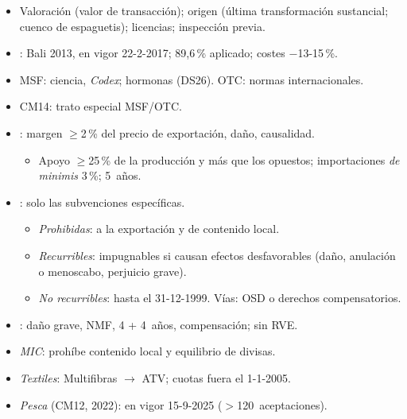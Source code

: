 \documentclass{article}
\begin{document}
\begin{columnas}
\begin{itemize}
\item Valoración (valor de transacción); origen (última transformación sustancial; cuenco de espaguetis); licencias; inspección previa.
\item {}: Bali 2013, en vigor 22-2-2017; 89,6\,\% aplicado; costes $-$13-15\,\%.
\end{itemize}
\begin{itemize}
\item MSF: ciencia, \emph{Codex}; hormonas (DS26). OTC: normas internacionales.
\item CM14: trato especial MSF/OTC.
\end{itemize}
\begin{itemize}
\item {}: margen $\geq$2\,\% del precio de exportación, daño, causalidad.
  \begin{itemize}
  \item Apoyo $\geq$25\,\% de la producción y más que los opuestos; importaciones \emph{de minimis} 3\,\%; 5~años.
  \end{itemize}
\item {}: solo las subvenciones específicas.
  \begin{itemize}
  \item \emph{Prohibidas}: a la exportación y de contenido local.
  \item \emph{Recurribles}: impugnables si causan efectos desfavorables (daño, anulación o menoscabo, perjuicio grave).
  \item \emph{No recurribles}: hasta el 31-12-1999. Vías: OSD o derechos compensatorios.
  \end{itemize}
\item {}: daño grave, NMF, 4 + 4~años, compensación; sin RVE.
\end{itemize}
\begin{itemize}
\item \emph{MIC}: prohíbe contenido local y equilibrio de divisas.
\item \emph{Textiles}: Multifibras $\to$ ATV; cuotas fuera el 1-1-2005.
\item \emph{Pesca} (CM12, 2022): en vigor 15-9-2025 ($>$120~aceptaciones).
  \begin{itemize}

\end{itemize}
\end{itemize}
\end{columnas}
\end{document}
